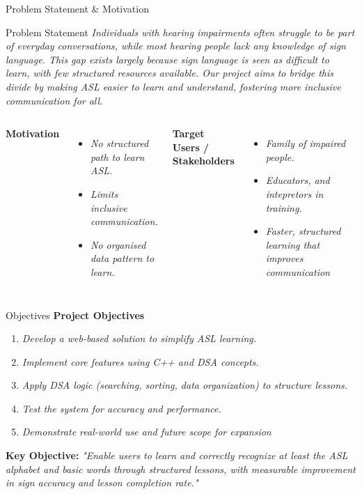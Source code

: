 \documentclass[aspectratio=169,10pt]{beamer}
\newcommand{\placeholder}[1]{\textit{\color{GEUGrey}#1}}
\begin{document}
\begin{frame}{Problem Statement \& Motivation}
\begin{block}{Problem Statement}
\placeholder{Individuals with hearing impairments often struggle to be part of everyday conversations, while most hearing people lack any knowledge of sign language. This gap exists largely because sign language is seen as difficult to learn, with few structured resources available. Our project aims to bridge this divide by making ASL easier to learn and understand, fostering more inclusive communication for all.}
\end{block}
\vspace{1mm}
\begin{columns}[T,totalwidth=\textwidth]
\textbf{\color{GEUBlue}Motivation}
\begin{itemize}\itemsep1pt
\item \placeholder{No structured path to learn ASL.}
\item \placeholder{Limits inclusive communication.}
\item \placeholder{No organised data pattern to learn.}
\end{itemize}
\textbf{\color{GEUBlue}Target Users / Stakeholders}
\begin{itemize}\itemsep1pt
\item \placeholder{Family of impaired people.}
\item \placeholder{Educators, and intepretors in training.}
\item \placeholder{Faster, structured learning that improves communication}
\end{itemize}
\end{columns}
\end{frame}

\begin{frame}{Objectives}
\textbf{\color{GEUBlue}Project Objectives}
\vspace{1mm}
\begin{enumerate}\itemsep1pt
\item \placeholder{Develop a web-based solution to simplify ASL learning.}
\item \placeholder{Implement core features using C++ and DSA concepts.}
\item \placeholder{Apply DSA logic (searching, sorting, data organization) to structure lessons.}
\item \placeholder{Test the system for accuracy and performance.}
\item \placeholder{Demonstrate real-world use and future scope for expansion}
\end{enumerate}
\vfill
\begin{center}
\colorbox{GEULightBlue}{\parbox{.80\textwidth}{\centering
\textbf{Key Objective:} \placeholder{"Enable users to learn and correctly recognize at least the ASL alphabet and basic words through structured lessons, with measurable improvement in sign accuracy and lesson completion rate."}}}
\end{center}
\end{frame}
\end{document}
